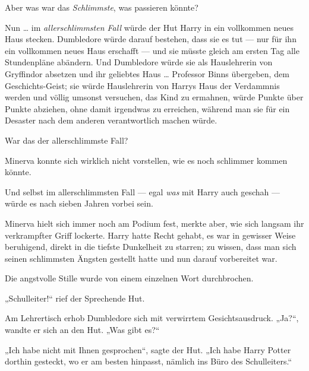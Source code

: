 Aber was war das \emph{Schlimmste}, was passieren könnte?

Nun … im \emph{allerschlimmsten Fall} würde der Hut Harry in ein vollkommen neues Haus stecken. Dumbledore würde darauf bestehen, dass sie es tut — nur für ihn ein vollkommen neues Haus erschafft — und sie müsste gleich am ersten Tag alle Stundenpläne abändern. Und Dumbledore würde sie als Hauslehrerin von Gryffindor absetzen und ihr geliebtes Haus … Professor Binns übergeben, dem Geschichts-Geist; sie würde Hauslehrerin von Harrys Haus der Verdammnis werden und völlig umsonst versuchen, das Kind zu ermahnen, würde Punkte über Punkte abziehen, ohne damit irgendwas zu erreichen, während man sie für ein Desaster nach dem anderen verantwortlich machen würde.

War das der allerschlimmste Fall?

Minerva konnte sich wirklich nicht vorstellen, wie es noch schlimmer kommen könnte.

Und selbst im allerschlimmsten Fall — egal \emph{was} mit Harry auch geschah — würde es nach sieben Jahren vorbei sein.

Minerva hielt sich immer noch am Podium fest, merkte aber, wie sich langsam ihr verkrampfter Griff lockerte. Harry hatte Recht gehabt, es war in gewisser Weise beruhigend, direkt in die tiefste Dunkelheit zu starren; zu wissen, dass man sich seinen schlimmsten Ängsten gestellt hatte und nun darauf vorbereitet war.

Die angstvolle Stille wurde von einem einzelnen Wort durchbrochen.

„Schulleiter!“ rief der Sprechende Hut.

Am Lehrertisch erhob Dumbledore sich mit verwirrtem Gesichtsausdruck.
„Ja?“, wandte er sich an den Hut.
„Was gibt es?“

„Ich habe nicht mit Ihnen gesprochen“, sagte der Hut.
„Ich habe Harry Potter dorthin gesteckt, wo er am besten hinpasst, nämlich ins Büro des Schulleiters.“

